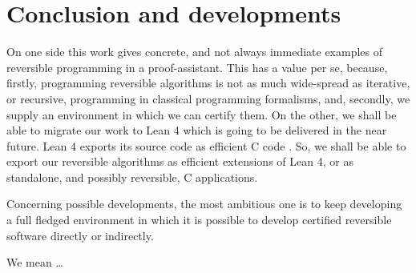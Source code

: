 \documentclass[runningheads]{llncs}
\newcommand{\CPP}{\textsf{C}\xspace}
\newcommand{\LEANFour}{\textsf{Lean 4}\xspace}
\begin{document}
\section{Conclusion and developments}
\label{section:Conclusion and developments}
On one side this work gives concrete, and not always immediate examples of reversible programming in a proof-assistant. This has a value per se, because, firstly, programming reversible algorithms is not as much wide-spread as iterative, or recursive, programming in classical programming formalisms, and, secondly, we supply an environment in which we can certify them.
On the other, we shall be able to migrate our work to \LEANFour which is going to be delivered in the near future. \LEANFour exports its source code as efficient \CPP code \cite{2021-LEAN4-MouraUllrich}. So, we shall be able to export our reversible algorithms as efficient extensions of \LEANFour, or as standalone, and possibly reversible, \CPP applications.

Concerning possible developments, the most ambitious one is to keep developing a full fledged environment in which it is possible to develop certified reversible software directly or indirectly.

We mean \ldots




\end{document}
